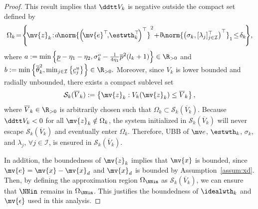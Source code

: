 \documentclass[letterpaper, journal]{IEEEtran}
\begin{document}
\begin{proof}
This result implies that $\ddtt V_{k}$ is negative outside the compact set defined by 
\begin{equation} 
  \Omega_k
  \!
  =
  \!
  \left\{
    \!
    \mv{z}_k
    \!
    :
    \!
    a
    \!
    \norm{
      \left(
        \!
        \mv{e}^\top
        \!
        ,
        \!
        \estwth_k^\top
        \!
      \right)^\top
    }^2
    \!
    +
    \!
    b
    \!
    \norm{
      \left(
        \sigma_k
        ,
        [\lambda_j]_{j\in\mathcal{I}}^\top
      \right)^\top
    }_1
    \!
    \le
    \!
    \delta_k
    \!
  \right\}
  \!
  ,
\end{equation}
where
$
    a
    :=
    \min
    \left\{
        \underline{p}
        - \eta_1
        - \eta_2
        ,
        \sigma_k^o
        -
        \tfrac{1}{4\eta_1}
        \overline{p}^2
        (l_k+1)
    \right\}
    \in\R_{>0}
$ 
and
$
    b
    :=
    \min
    \left\{
        \overline{\theta}_k^2
        ,
        \min_{j\in\mathcal{I}} 
        \left\{
            \underline{c}_j^u
        \right\}
    \right\}
    \in\R_{>0}
    .
$
Moreover, since $V_k$ is lower bounded and radially unbounded, there exists a compact sublevel set
\begin{equation} \label{eq:Sk:def}
  \mathcal S_k(\overline V_k)
  :=
  \left\{ 
    \mv{z}_k 
    : 
    V_k(\mv{z}_k)
    \le 
    \overline{V}_k 
  \right\}
  ,
\end{equation}
where $\overline{V}_k\in\R_{>0}$ is arbitrarily chosen such that $\Omega_k \subset \mathcal{S}_k(\overline{V}_k)$.
Because $\ddtt V_k<0$ for all $\mv{z}_k\notin\Omega_k$, the system initialized in $\mathcal{S}_k(\overline{V}_k)$ will never escape $\mathcal{S}_k(\overline{V}_k)$ and eventually enter $\Omega_k$.
Therefore, UBB of $\mv e$, $\estwth_k$, $\sigma_k$, and $\lambda_j$, $\forall j\in\mathcal I$, is ensured in $\mathcal{S}_k(\overline{V}_k)$.

In addition, the boundedness of $\mv{z}_k$ implies that $\mv{x}$ is bounded, since $\mv{e}=\mv{x}-\mv{x}_d$ and $\mv{x}_d$ is bounded by Assumption~\ref{assum:xd}.
Then, by defining the approximation region $\Omega_{\NNin}$ as $\mathcal{S}_k(\overline{V}_k)$, we can ensure that $\NNin$ remains in $\Omega_{\NNin}$.
This justifies the boundedness of $\idealwth_k$ and $\mv{\epsilon}$ used in this analysis.


\end{proof}
\end{document}
